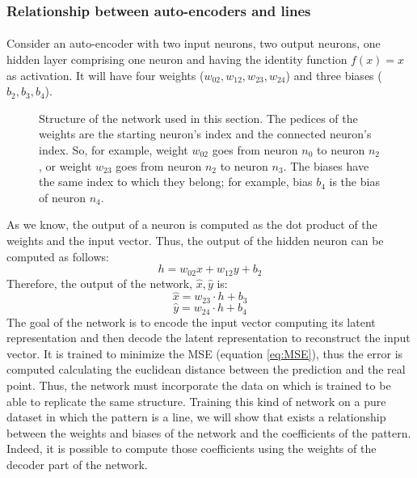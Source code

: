 \subsubsection{Relationship between auto-encoders and lines}
\paragraph{}
Consider an auto-encoder with two input neurons, two output neurons, one hidden layer comprising one neuron and having the identity function $f(x) = x$ as activation. It will have four weights ($w_{02}, w_{12}, w_{23}, w_{24}$) and three biases ($b_{2}, b_{3}, b_{4}$).
\begin{figure}[ht]
    \centering
    
    \caption{Structure of the network used in this section. The pedices of the weights are the starting neuron's index and the connected neuron's index. So, for example, weight $w_{02}$ goes from neuron $n_0$ to neuron $n_2$, or weight $w_{23}$ goes from neuron $n_2$ to neuron $n_3$. The biases have the same index to which they belong; for example, bias $b_4$ is the bias of neuron $n_4$.}
    \label{fig:ae_212}
\end{figure}
As we know, the output of a neuron is computed as the dot product of the weights and the input vector. Thus, the output of the hidden neuron can be computed as follows:
\begin{equation}
    h = w_{02} x + w_{12} y + b_2
\end{equation}
Therefore, the output of the network, $\hat{x}, \hat{y}$ is:
\begin{equation}
\label{eq:x_hat}
    \hat{x} = w_{23} \cdot h + b_{3}
\end{equation}
\begin{equation}
\label{eq:y_hat}
    \hat{y} = w_{24} \cdot h + b_{4}
\end{equation}
The goal of the network is to encode the input vector computing its latent representation and then decode the latent representation to reconstruct the input vector. It is trained to minimize the MSE (equation \ref{eq:MSE}), thus the error is computed calculating the euclidean distance between the prediction and the real point. Thus, the network must incorporate the data on which is trained to be able to replicate the same structure. \newline
Training this kind of network on a pure dataset in which the pattern is a line, we will show that exists a relationship between the weights and biases of the network and the coefficients of the pattern. Indeed, it is possible to compute those coefficients using the weights of the decoder part of the network.

